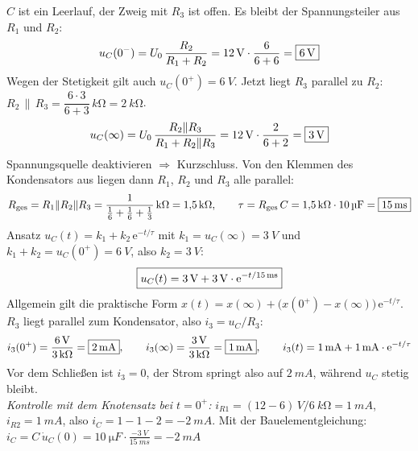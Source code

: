 \documentclass[11pt,a4paper]{article}
\begin{document}
\begin{loesung}
$C$ ist ein Leerlauf, der Zweig mit $R_3$ ist offen. Es bleibt der Spannungsteiler aus $R_1$ und $R_2$:
\[
  u_C(0^-) = U_0\,\frac{R_2}{R_1+R_2} = \SI{12}{V}\cdot\frac{6}{6+6} = \ergebnis{\SI{6}{V}}
\]
Wegen der Stetigkeit gilt auch $u_C(0^+) = \SI{6}{V}$.
Jetzt liegt $R_3$ parallel zu $R_2$: $R_2 \,\|\, R_3 = \dfrac{6\cdot 3}{6+3}\,\si{k\ohm} = \SI{2}{k\ohm}$.
\[
  u_C(\infty) = U_0\,\frac{R_2\|R_3}{R_1 + R_2\|R_3} = \SI{12}{V}\cdot\frac{2}{6+2} = \ergebnis{\SI{3}{V}}
\]
Spannungsquelle deaktivieren $\Rightarrow$ Kurzschluss. Von den Klemmen des Kondensators aus liegen dann $R_1$, $R_2$ und $R_3$ alle parallel:
\[
  R_\text{ges} = R_1\|R_2\|R_3 = \frac{1}{\frac{1}{6}+\frac16+\frac13}\,\si{k\ohm} = \SI{1.5}{k\ohm},
  \qquad \tau = R_\text{ges}\, C = \SI{1.5}{k\ohm}\cdot\SI{10}{\micro F} = \ergebnis{\SI{15}{ms}}
\]
Ansatz $u_C(t) = k_1 + k_2\,\mathrm{e}^{-t/\tau}$ mit $k_1 = u_C(\infty) = \SI{3}{V}$ und $k_1 + k_2 = u_C(0^+) = \SI{6}{V}$, also $k_2 = \SI{3}{V}$:
\[
  \ergebnis{u_C(t) = \SI{3}{V} + \SI{3}{V}\cdot\mathrm{e}^{-t/\SI{15}{ms}}}
\]
Allgemein gilt die praktische Form $x(t) = x(\infty) + \bigl(x(0^+) - x(\infty)\bigr)\,\mathrm{e}^{-t/\tau}$.
$R_3$ liegt parallel zum Kondensator, also $i_3 = u_C/R_3$:
\[
  i_3(0^+) = \frac{\SI{6}{V}}{\SI{3}{k\ohm}} = \ergebnis{\SI{2}{mA}}, \qquad
  i_3(\infty) = \frac{\SI{3}{V}}{\SI{3}{k\ohm}} = \ergebnis{\SI{1}{mA}}, \qquad
  i_3(t) = \SI{1}{mA} + \SI{1}{mA}\cdot\mathrm{e}^{-t/\tau}
\]
Vor dem Schließen ist $i_3 = 0$, der Strom springt also auf $\SI{2}{mA}$, während $u_C$ stetig bleibt.\\
\emph{Kontrolle mit dem Knotensatz bei $t=0^+$:} $i_{R1} = (12-6)\,\si{V}/\SI{6}{k\ohm} = \SI{1}{mA}$, $i_{R2} = \SI{1}{mA}$, also $i_C = 1 - 1 - 2 = \SI{-2}{mA}$. Mit der Bauelementgleichung: $i_C = C\,\dot u_C(0) = \SI{10}{\micro F}\cdot\frac{\SI{-3}{V}}{\SI{15}{ms}} = \SI{-2}{mA}$ \checkmark
{}
\begin{center}
\end{center}
\end{loesung}
\end{document}
